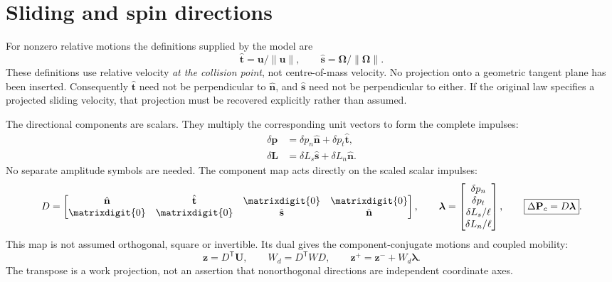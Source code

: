 \documentclass[11pt,a4paper]{article}
\newcommand{\zmat}{\matrixdigit{0}}
\begin{document}
\section{Sliding and spin directions}
For nonzero relative motions the definitions supplied by the model are
\begin{equation}
\boxed{\hat{\mathbf{t}}=\mathbf{u}/\|\mathbf{u}\|},\qquad
\boxed{\hat{\mathbf{s}}=\boldsymbol{\Omega}/\|\boldsymbol{\Omega}\|}.
\end{equation}
These definitions use relative velocity \emph{at the collision point}, not centre-of-mass velocity. No projection onto a geometric tangent plane has been inserted. Consequently $\hat{\mathbf{t}}$ need not be perpendicular to $\hat{\mathbf{n}}$, and $\hat{\mathbf{s}}$ need not be perpendicular to either. If the original law specifies a projected sliding velocity, that projection must be recovered explicitly rather than assumed.

The directional components are scalars. They multiply the corresponding unit vectors to form the complete impulses:
\begin{align}
\delta\mathbf{p}&=\delta p_n\hat{\mathbf{n}}+\delta p_t\hat{\mathbf{t}},\\
\delta\mathbf{L}&=\delta L_s\hat{\mathbf{s}}+\delta L_n\hat{\mathbf{n}}.
\end{align}
No separate amplitude symbols are needed. The component map acts directly on the scaled scalar impulses:
\begin{equation}
D=\begin{bmatrix}
\hat{\mathbf{n}}&\hat{\mathbf{t}}&\zmat&\zmat\\
\zmat&\zmat&\hat{\mathbf{s}}&\hat{\mathbf{n}}
\end{bmatrix},\qquad
\boldsymbol{\lambda}=\begin{bmatrix}\delta p_n\\\delta p_t\\\delta L_s/\ell\\\delta L_n/\ell\end{bmatrix},\qquad
\boxed{\Delta\mathbf{P}_c=D\boldsymbol{\lambda}}.
\end{equation}
This map is not assumed orthogonal, square or invertible. Its dual gives the component-conjugate motions and coupled mobility:
\begin{equation}
\mathbf{z}=D^{\mathsf T}\mathbf{U},\qquad
W_d=D^{\mathsf T}WD,\qquad
\boxed{\mathbf{z}^+=\mathbf{z}^-+W_d\boldsymbol{\lambda}}.
\end{equation}
The transpose is a work projection, not an assertion that nonorthogonal directions are independent coordinate axes.
\end{document}
